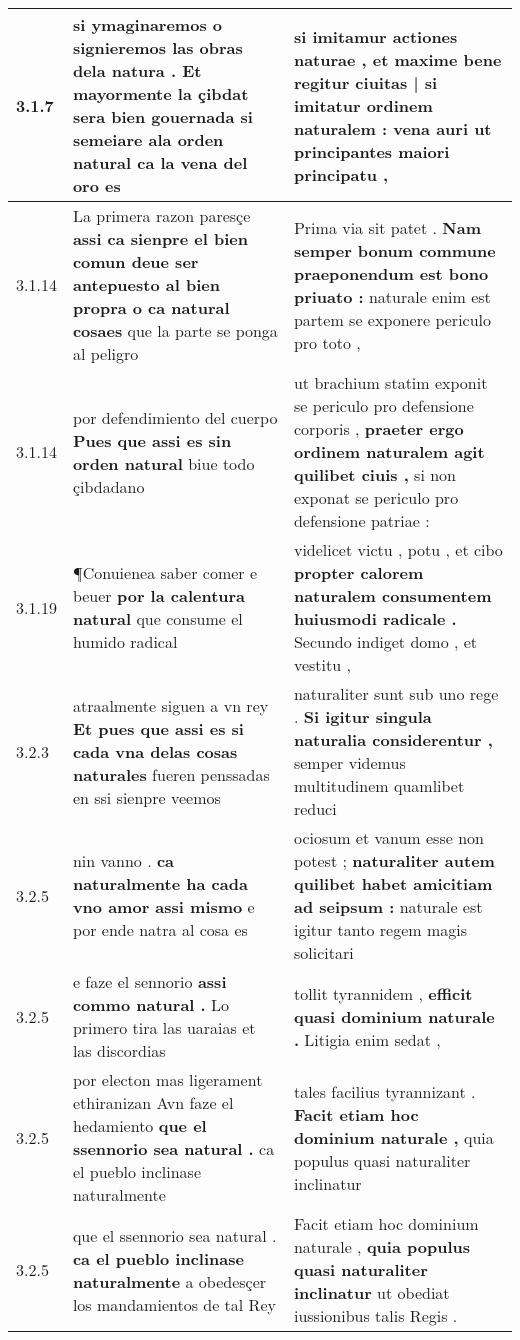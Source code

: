 \begin{tabular}{|p{1cm}|p{6.5cm}|p{6.5cm}|}
3.1.7 & si ymaginaremos o signieremos las obras dela natura . \textbf{ Et mayormente la çibdat sera bien gouernada si semeiare ala orden natural } ca la vena del oro es & si imitamur actiones naturae , \textbf{ et maxime bene regitur ciuitas | si imitatur ordinem naturalem : } vena auri ut principantes maiori principatu , \\\hline
3.1.14 & La primera razon paresçe \textbf{ assi ca sienpre el bien comun deue ser antepuesto al bien propra o ca natural cosaes } que la parte se ponga al peligro & Prima via sit patet . \textbf{ Nam semper bonum commune praeponendum est bono priuato : } naturale enim est partem se exponere periculo pro toto , \\\hline
3.1.14 & por defendimiento del cuerpo \textbf{ Pues que assi es sin orden natural } biue todo çibdadano & ut brachium statim exponit se periculo pro defensione corporis , \textbf{ praeter ergo ordinem naturalem agit quilibet ciuis , } si non exponat se periculo pro defensione patriae : \\\hline
3.1.19 & ¶Conuienea saber comer e beuer \textbf{ por la calentura natural } que consume el humido radical & videlicet victu , potu , et cibo \textbf{ propter calorem naturalem consumentem huiusmodi radicale . } Secundo indiget domo , et vestitu , \\\hline
3.2.3 & atraalmente siguen a vn rey \textbf{ Et pues que assi es si cada vna delas cosas naturales } fueren penssadas en ssi sienpre veemos & naturaliter sunt sub uno rege . \textbf{ Si igitur singula naturalia considerentur , } semper videmus multitudinem quamlibet reduci \\\hline
3.2.5 & nin vanno . \textbf{ ca naturalmente ha cada vno amor assi mismo } e por ende natra al cosa es & ociosum et vanum esse non potest ; \textbf{ naturaliter autem quilibet habet amicitiam ad seipsum : } naturale est igitur tanto regem magis solicitari \\\hline
3.2.5 & e faze el sennorio \textbf{ assi commo natural . } Lo primero tira las uaraias et las discordias & tollit tyrannidem , \textbf{ efficit quasi dominium naturale . } Litigia enim sedat , \\\hline
3.2.5 & por electon mas ligerament ethiranizan Avn faze el hedamiento \textbf{ que el ssennorio sea natural . } ca el pueblo inclinase naturalmente & tales facilius tyrannizant . \textbf{ Facit etiam hoc dominium naturale , } quia populus quasi naturaliter inclinatur \\\hline
3.2.5 & que el ssennorio sea natural . \textbf{ ca el pueblo inclinase naturalmente } a obedesçer los mandamientos de tal Rey & Facit etiam hoc dominium naturale , \textbf{ quia populus quasi naturaliter inclinatur } ut obediat iussionibus talis Regis . \\\hline

\end{tabular}
